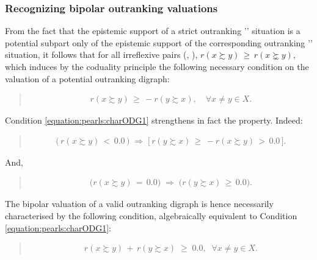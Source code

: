 \documentclass[a4paper,12pt,english]{sphinxhowto}
\begin{document}
\subsubsection{Recognizing bipolar outranking valuations}
\label{\detokenize{pearls:recognizing-bipolar-outranking-valuations}}
\sphinxAtStartPar
From the fact that the epistemic support of a strict outranking \textendash{}’’\textendash{} situation is a potential sub\sphinxhyphen{}part only of the epistemic support of the corresponding outranking \textendash{}’’\textendash{} situation, it follows that for all irreflexive pairs (, ), \(r(x \succsim y)\, \geqslant\, r(x \succnsim y)\), which induces by the coduality principle the following necessary condition on the valuation of a potential outranking digraph:
\begin{quote}
\begin{equation}\label{equation:pearls:charODG1}
\begin{split}r(x \succsim y)\, \geqslant\, -r(y \succsim x), \quad \forall x \neq y \in X.\end{split}
\end{equation}\end{quote}

\sphinxAtStartPar
Condition \eqref{equation:pearls:charODG1} strengthens in fact the  property. Indeed:
\begin{quote}
\begin{equation}\label{equation:pearls:weakComp}
\begin{split}\big(\, r(x \succsim y)\, <\, 0.0\, \big) \; \Rightarrow \; \big[\, r(y \succsim x)\, \geqslant\, -r(x \succsim y)\, >\, 0.0 \,\big].\end{split}
\end{equation}\end{quote}

\sphinxAtStartPar
And,
\begin{quote}
\begin{equation}\label{equation:pearls:indODG}
\begin{split}\big(r(x \succsim y)\, =\, 0.0\big)\; \Rightarrow \; \big(r(y \succsim x)\, \geqslant\, 0.0\big).\end{split}
\end{equation}\end{quote}

\sphinxAtStartPar
The bipolar valuation of a valid outranking digraph is hence necessarily characterised by the following condition, algebraically equivalent to Condition \eqref{equation:pearls:charODG1}:
\begin{quote}
\begin{equation}\label{equation:pearls:charODG2}
\begin{split}r(x \succsim y)\,+\,r(y \succsim x) \; \geqslant \; 0.0, \;\; \forall x \neq y \in X.\end{split}
\end{equation}\end{quote}
\end{document}
